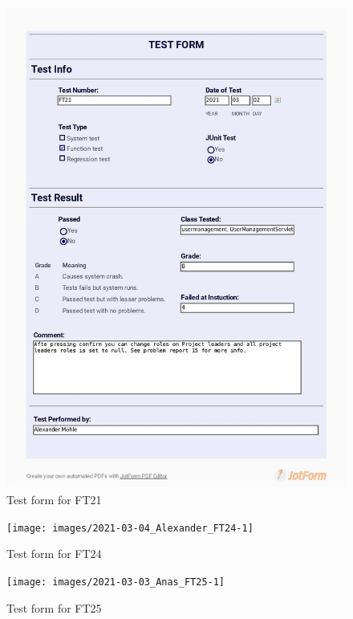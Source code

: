\documentclass{article}
\begin{document}
 \begin{figure}
     \centering
      \includegraphics[trim={1cm 3cm 1cm 1.5cm}, clip,width=13cm]{images/2021-03-02_Alexander_FT21_001}
     \renewcommand\figurename{Figure}
     \caption{Test form for FT21}
     \label{fig:my_label}
 \end{figure}
 
 \begin{figure}
     \centering
      \texttt{[image: images/2021-03-04\_Alexander\_FT24-1]}
     \renewcommand\figurename{Figure}
     \caption{Test form for FT24}
     \label{fig:my_label}
 \end{figure}
 
 \begin{figure}
     \centering
      \texttt{[image: images/2021-03-03\_Anas\_FT25-1]}
     \renewcommand\figurename{Figure}
     \caption{Test form for FT25}
     \label{fig:my_label}
 \end{figure}
 
\end{document}
